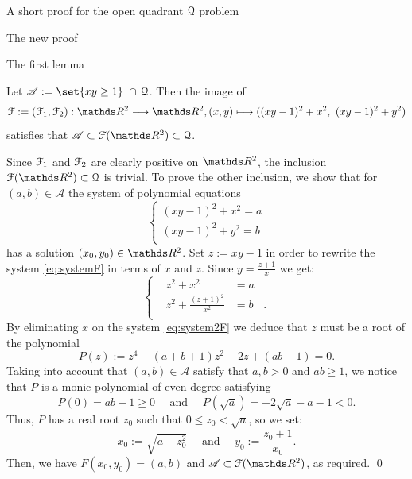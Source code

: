 \documentclass[11pt, a4paper, english, twoside, notitlepage, openright]{report}
\begin{document}
\begin{chapter}{A short proof for the open quadrant $\mathcal{Q}$ problem}
\begin{section}{The new proof}
\begin{subsection}{The first lemma}
\begin{lemma}\label{lemma1}
Let $\mathscr{A} := \set{xy \ge 1}\ \cap\, \Qu$. Then the image of 
$$
\FF := (\FF_1, \FF_2): \R^2 \longrightarrow \R^2, (x, y) \longmapsto ((xy - 1)^2 + x^2,\ (xy - 1)^2 + y^2)
$$
satisfies that $\mathscr{A} \subset \FF(\R^2) \subset \Qu$.
\begin{Proof}
Since $\mathcal{F}_1$ and $\mathcal{F}_2$ are clearly positive on $\R^2$, the inclusion $\FF(\R^2) \subset \Qu$ is trivial. To prove the other inclusion, we show that for $(a,b) \in \mathscr{A}$ the system of polynomial equations
\begin{equation}\label{eq:systemF}
\left\{
\begin{aligned}
(xy - 1)^2 + x^2 = a\\
(xy - 1)^2 + y^2 = b\\
\end{aligned}
\right.
\end{equation}
has a solution $(x_0, y_0) \in \R^2$. Set $z := xy - 1$ in order to rewrite the system \ref{eq:systemF} in terms of $x$ and $z$. Since $y = \frac{z + 1}{x}$ we get:
\begin{equation}\label{eq:system2F}
\left\{
\begin{aligned}
&z^2 + x^2 &= a\\
&z^2 + \frac{(z + 1)^2}{x^2} &= b&.\\
\end{aligned}
\right.
\end{equation}
By eliminating $x$ on the system \ref{eq:system2F} we deduce that $z$ must be a root of the polynomial
$$
P(z) := z^4 - (a + b + 1)z^2 - 2z + (ab - 1) = 0.
$$
Taking into account that $(a, b) \in \mathscr{A}$ satisfy that $a, b > 0$ and $ab \ge 1$, we notice that $P$ is a monic polynomial of even degree satisfying
$$
P(0) = ab - 1 \ge 0\quad \text{ and }\quad P(\sqrt{a}) = -2 \sqrt{a} - a - 1 < 0.
$$
Thus, $P$ has a real root $z_0$ such that $0 \le z_0 < \sqrt{a}$, so we set:
$$
x_0 := \sqrt{a - z_0^2} \quad \text{ and } \quad y_0 := \frac{z_0 + 1}{x_0}.
$$
Then, we have $F(x_0, y_0) = (a, b)$ and $\mathscr{A} \subset \FF(\R^2)$, as required.
\qed
\end{Proof}
\end{lemma}
\end{subsection}


\end{section}
\end{chapter}
\end{document}

